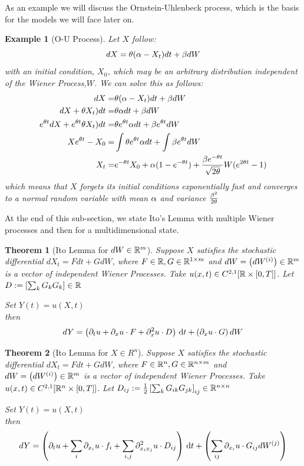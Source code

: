 \documentclass{article}
\newtheorem{thm}{Theorem}[section]
\newtheorem{ex}{Example}[thm]
\begin{document}
As an example we will discuss the Ornstein-Uhlenbeck process, which is the
basis for the models we will face later on.
\begin{ex}[O-U Process] Let $X$ follow:
\begin{equation*}
dX = {\theta} ({\alpha} - X_t) dt + {\beta} dW
\end{equation*}
with an initial condition, $X_0$, which may be an arbitrary distribution
independent of the Wiener Process,$W$.
We can solve this as follows:
\begin{align*}
dX =& {\theta} ({\alpha} - X_t) dt + {\beta} dW
\\
dX + {\theta} X_t) dt=& {\theta} {\alpha} dt + {\beta} dW
\\
e^{{\theta} t} dX + e^{{\theta} t}{\theta} X_t) dt=& {\theta} e^{{\theta} t}{\alpha} dt + {\beta} e^{{\theta} t} dW
\\
Xe^{{\theta} t} - X_0 = & \int {\theta} e^{{\theta} t}{\alpha} dt +  \int {\beta} e^{{\theta} t} dW
\\
X_t =& e^{-{\theta} t} X_0 + {\alpha}(1-e^{-{\theta} t}) +  \frac{{\beta} e^{-{\theta} t}}{\sqrt{2{\theta}}}
W(e^{2{\theta} t}-1)
\end{align*}
which means that $X$ forgets its initial conditions exponentially fast and
converges to a normal random variable with mean ${\alpha}$ and variance
$\tfrac{{\beta}^2}{2{\theta}}$
\end{ex}

At the end of this sub-section, we state Ito's Lemma with multiple Wiener
processes and then for a multidimensional state.

\begin{thm}[Ito Lemma for $dW \in  { \mathbb{R} }^{m}$] Suppose $X$ satisfies the stochastic
differential $dX_t = F dt + G dW$, where $ F \in { \mathbb{R} }, G \in { \mathbb{R} }^{1\times m}$ and
$dW = \left(dW^{(i)}\right) \in  { \mathbb{R} }^{m}$ is a vector of independent Wiener
Processes. Take $u(x,t) \in C^{2,1}[ { \mathbb{R} } \times [0,T]]$. Let $D :=\left[{\sum_k
G_{k} G_{k} } \right] \in { \mathbb{R} }$

Set $Y(t) = u(X,t)$
\\
then
$$
dY =  \left( {\partial}_t u +  {\partial}_{x} u \cdot F + 
  {\partial}^2_{x} u \cdot D \right)
\, \mathrm{d} t +
 \left(  {\partial}_{x} u  \cdot  G \right) dW  
$$
\end{thm}

\begin{thm}[Ito Lemma for $X \in R^n$]
Suppose $X$ satisfies the stochastic differential $dX_t = F dt + G dW$, where $
F \in { \mathbb{R} }^n, G \in { \mathbb{R} }^{n\times m}$ and $dW = \left(dW^{(i)}\right) \in  { \mathbb{R} }^{ 
m}$ is a vector of independent Wiener Processes. Take $u(x,t) \in C^{2,1}[ { \mathbb{R} }^n
\times [0,T]]$. Let $D_{ij} := \tfrac{1}{2} \left[{\sum_k G_{ik} G_{jk} }
\right]_{ij} \in { \mathbb{R} }^{n\times n} $

Set $Y(t) = u(X,t)$
\\
then
$$
dY =  \left( {\partial}_t u + \sum_i {\partial}_{x_i} u \cdot f_i + 
\sum_{i,j} {\partial}^2_{x_i x_j} u \cdot D_{ij} \right)
\, \mathrm{d} t +
 \left(  \sum_{ij} {\partial}_{x_i} u  \cdot G_{ij} dW^{(j)} 
\right)$$
\end{thm} 
\end{document}
